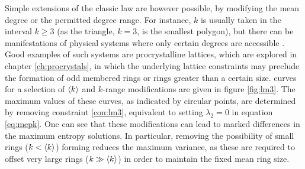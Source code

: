Simple extensions of the classic law are however possible, by modifying the mean degree or the permitted degree range.
For instance, $k$ is usually taken in the interval $k\geq3$ (as the triangle, $k=3$, is the smallest polygon), but there can be manifestations of physical systems where only certain degrees are accessible \cite{Rivier1988}.
Good examples of such systems are procrystalline lattices, which are explored in chapter \ref{ch:procrystals}, in which the underlying lattice constraints may preclude the formation of odd membered rings or rings greater than a certain size. 
\lm{} curves for a selection of $\langle k \rangle$ and $k$\--range modifications are given in figure \ref{fig:lm3}. 
The maximum values of these curves, as indicated by circular points, are determined by removing constraint \eqref{con:lm3}, equivalent to setting $\lambda_2=0$ in equation \eqref{eq:mepk}.
One can see that these modifications can lead to marked differences in the maximum entropy solutions.
In particular, removing the possibility of small rings ($k<\langle k \rangle$) forming reduces the maximum variance, as these are required to offset very large rings ($k\gg\langle k \rangle$) in order to maintain the fixed mean ring size.




